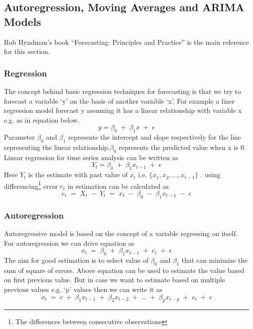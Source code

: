  
\subsection{Autoregression, Moving Averages and ARIMA Models} \label{ARIMA}    
 Rob Hyndman's book ``Forecasting: Principles and Practice''\cite{hyndman2014forecasting} is the main reference for this section. 
 \subsubsection{Regression}The concept behind basic regression techniques for forecasting is that we try to forecast a variable `y' on the basis of another variable `x'. For example a liner regression model forecast y assuming it has a linear relationship with  variable x e.g. as in equation below.
 $$ y = \beta_{0}\;+\;\beta_{1}x\;+\;\epsilon $$
 Parameter \(\beta_0\) and \(\beta_1\) represents the intercept and slope respectively for the line representing  the linear relationship.\(\beta_0\) represents the predicted value when x is 0. Linear regression for time series analysis can be written as 
 $$ Y_{t} = \beta_{0}\;+\;\beta_{1}x_{t-1}\;+\;\epsilon $$
 Here \(Y_{t}\) is the estimate with past value of \(x_{t}\) i.e. \(\{x_1,x_2,\dotsc, x_{t-1}\}\) . using differencing\footnote{The differences between consecutive observations} error \(e_{t}\) in estimation can be calculated as
 \begin{equation}
 e_{t}\;=\; X_{t}\; -\; Y_{t}\;=\; x_{t}\; -\;\beta_{0}\;-\;\beta_{1}x_{t-1}\;-\;\epsilon
 \end{equation}
 \subsubsection{Autoregression}  
 Autoregressive model is based on the concept of a variable regressing on itself. For autoregression we can drive equation as
  \begin{equation}
  x_{t}\; =\;\beta_{0}\;+\;\beta_{1}x_{t-1}\;+\;e_{t}\;+\;\epsilon
  \end{equation} 
  The aim for good estimation is to select value of \(\beta_0\) and \(\beta_1\) that can minimize the sum of square of errors. Above equation can be used to estimate the value based on first previous value. But in case we want to estimate based on multiple previous values e.g. `p' values then we can write it as 
 \begin{equation} \label{AR}
  x_{t}\; =\;c\;+\;\beta_{1}x_{t-1}\;+\;\beta_{2}x_{t-2}\;+\;\dotsc\;+\;\beta_{p}x_{t-p}\;+\;e_{t}\;+\;\epsilon
 \end{equation}
 
